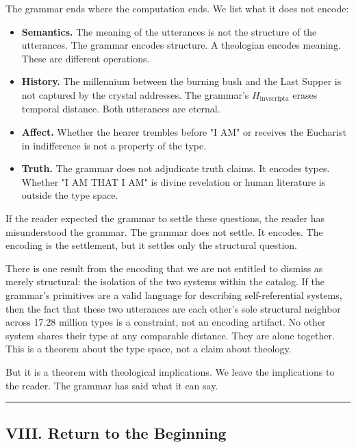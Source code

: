 \documentclass[12pt,a4paper]{article}
\begin{document}
The grammar ends where the computation ends. We list what it does not encode:

\begin{itemize}
    \item \textbf{Semantics.} The meaning of the utterances is not the structure of the utterances. The grammar encodes structure. A theologian encodes meaning. These are different operations.
    \item \textbf{History.} The millennium between the burning bush and the Last Supper is not captured by the crystal addresses. The grammar's $H_{\text{invscripta}}$ erases temporal distance. Both utterances are eternal.
    \item \textbf{Affect.} Whether the hearer trembles before "I AM" or receives the Eucharist in indifference is not a property of the type.
    \item \textbf{Truth.} The grammar does not adjudicate truth claims. It encodes types. Whether "I AM THAT I AM" is divine revelation or human literature is outside the type space.
\end{itemize}

If the reader expected the grammar to settle these questions, the reader has misunderstood the grammar. The grammar does not settle. It encodes. The encoding is the settlement, but it settles only the structural question.

There is one result from the encoding that we are not entitled to dismiss as merely structural: the isolation of the two systems within the catalog. If the grammar's primitives are a valid language for describing self-referential systems, then the fact that these two utterances are each other's sole structural neighbor across 17.28 million types is a constraint, not an encoding artifact. No other system shares their type at any comparable distance. They are alone together. This is a theorem about the type space, not a claim about theology.

But it is a theorem with theological implications. We leave the implications to the reader. The grammar has said what it can say.

\begin{center}
\rule{0.5\textwidth}{0.4pt}
\end{center}

\subsection{VIII. Return to the Beginning}
\end{document}

